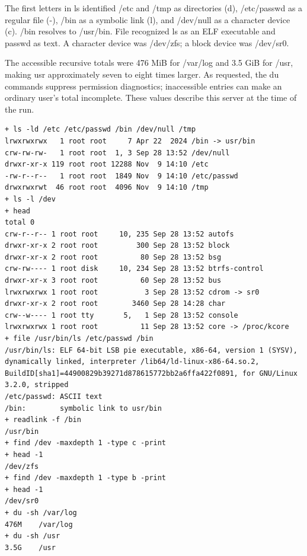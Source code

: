 \documentclass[12pt,a4paper]{article}
\begin{document}
The first letters in ls identified
{\ttfamily\fontsize{10}{12}\selectfont /etc} and
{\ttfamily\fontsize{10}{12}\selectfont /tmp} as directories
({\ttfamily\fontsize{10}{12}\selectfont d}),
{\ttfamily\fontsize{10}{12}\selectfont /etc/passwd} as a regular file
({\ttfamily\fontsize{10}{12}\selectfont -}),
{\ttfamily\fontsize{10}{12}\selectfont /bin} as a symbolic link
({\ttfamily\fontsize{10}{12}\selectfont l}), and
{\ttfamily\fontsize{10}{12}\selectfont /dev/null} as a character device
({\ttfamily\fontsize{10}{12}\selectfont c}).
{\ttfamily\fontsize{10}{12}\selectfont /bin} resolves to
{\ttfamily\fontsize{10}{12}\selectfont /usr/bin}. File recognized ls as
an ELF executable and passwd as text. A character device was
{\ttfamily\fontsize{10}{12}\selectfont /dev/zfs}; a block device was
{\ttfamily\fontsize{10}{12}\selectfont /dev/sr0}.

The accessible recursive totals were 476 MiB for
{\ttfamily\fontsize{10}{12}\selectfont /var/log} and 3.5 GiB for
{\ttfamily\fontsize{10}{12}\selectfont /usr}, making usr approximately
seven to eight times larger. As requested, the du commands suppress
permission diagnostics; inaccessible entries can make an ordinary user's
total incomplete. These values describe this server at the time of the
run.

\begin{lstlisting}
+ ls -ld /etc /etc/passwd /bin /dev/null /tmp
lrwxrwxrwx   1 root root     7 Apr 22  2024 /bin -> usr/bin
crw-rw-rw-   1 root root  1, 3 Sep 28 13:52 /dev/null
drwxr-xr-x 119 root root 12288 Nov  9 14:10 /etc
-rw-r--r--   1 root root  1849 Nov  9 14:10 /etc/passwd
drwxrwxrwt  46 root root  4096 Nov  9 14:10 /tmp
+ ls -l /dev
+ head
total 0
crw-r--r-- 1 root root     10, 235 Sep 28 13:52 autofs
drwxr-xr-x 2 root root         300 Sep 28 13:52 block
drwxr-xr-x 2 root root          80 Sep 28 13:52 bsg
crw-rw---- 1 root disk     10, 234 Sep 28 13:52 btrfs-control
drwxr-xr-x 3 root root          60 Sep 28 13:52 bus
lrwxrwxrwx 1 root root           3 Sep 28 13:52 cdrom -> sr0
drwxr-xr-x 2 root root        3460 Sep 28 14:28 char
crw--w---- 1 root tty       5,   1 Sep 28 13:52 console
lrwxrwxrwx 1 root root          11 Sep 28 13:52 core -> /proc/kcore
+ file /usr/bin/ls /etc/passwd /bin
/usr/bin/ls: ELF 64-bit LSB pie executable, x86-64, version 1 (SYSV), dynamically linked, interpreter /lib64/ld-linux-x86-64.so.2, BuildID[sha1]=44900829b39271d878615772bb2a6ffa422f0891, for GNU/Linux 3.2.0, stripped
/etc/passwd: ASCII text
/bin:        symbolic link to usr/bin
+ readlink -f /bin
/usr/bin
+ find /dev -maxdepth 1 -type c -print
+ head -1
/dev/zfs
+ find /dev -maxdepth 1 -type b -print
+ head -1
/dev/sr0
+ du -sh /var/log
476M    /var/log
+ du -sh /usr
3.5G    /usr
\end{lstlisting}
\end{document}
